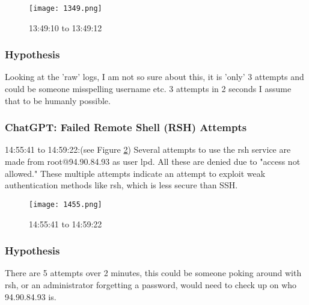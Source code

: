 \documentclass[
	letterpaper, %
	10pt, %
	unnumberedsections, %
	twoside, %
]{APAAssignment}
\begin{document}
\begin{figure}[!htp] %
	\centering
	\texttt{[image: 1349.png]}
	\caption{13:49:10 to 13:49:12}	\label{fig:1349}
\end{figure}



\subsubsection{Hypothesis}
Looking at the 'raw' logs, I am not so sure about this, it is 'only' 3 attempts and could be someone misspelling username etc. 3 attempts in 2 seconds I assume that to be humanly possible.

\subsubsection{ChatGPT: Failed Remote Shell (RSH) Attempts} 14:55:41 to 14:59:22:(see Figure \ref{fig:1455}) Several attempts to use the rsh service are made from root@94.90.84.93 as user lpd. All these are denied due to "access not allowed." These multiple attempts indicate an attempt to exploit weak authentication methods like rsh, which is less secure than SSH. \\

\begin{figure}[!htp] %
	\centering
	\texttt{[image: 1455.png]}
	\caption{14:55:41 to 14:59:22}	\label{fig:1455}
\end{figure}

\subsubsection{Hypothesis}
There are 5 attempts over 2 minutes, this could be someone poking around with rsh, or an administrator forgetting a password, would need to check up on who 94.90.84.93 is.  


\clearpage
\printbibliography %




\end{document}
